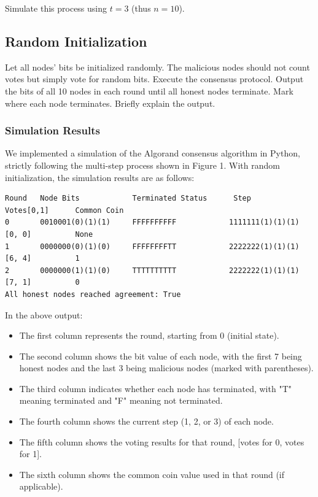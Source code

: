 \documentclass[12pt,a4paper]{article}
\begin{document}
Simulate this process using $t = 3$ (thus $n = 10$).

\subsection{Random Initialization}

Let all nodes' bits be initialized randomly. The malicious nodes should not count votes but simply vote for random bits. Execute the consensus protocol. Output the bits of all 10 nodes in each round until all honest nodes terminate. Mark where each node terminates. Briefly explain the output.

\subsubsection{Simulation Results}

We implemented a simulation of the Algorand consensus algorithm in Python, strictly following the multi-step process shown in Figure 1. With random initialization, the simulation results are as follows:

\begin{verbatim}
Round   Node Bits            Terminated Status      Step                Votes[0,1]      Common Coin
0       0010001(0)(1)(1)     FFFFFFFFFF            1111111(1)(1)(1)    [0, 0]          None
1       0000000(0)(1)(0)     FFFFFFFFTT            2222222(1)(1)(1)    [6, 4]          1
2       0000000(1)(1)(0)     TTTTTTTTTT            2222222(1)(1)(1)    [7, 1]          0
All honest nodes reached agreement: True
\end{verbatim}

In the above output:
\begin{itemize}
    \item The first column represents the round, starting from 0 (initial state).
    \item The second column shows the bit value of each node, with the first 7 being honest nodes and the last 3 being malicious nodes (marked with parentheses).
    \item The third column indicates whether each node has terminated, with "T" meaning terminated and "F" meaning not terminated.
    \item The fourth column shows the current step (1, 2, or 3) of each node.
    \item The fifth column shows the voting results for that round, [votes for 0, votes for 1].
    \item The sixth column shows the common coin value used in that round (if applicable).
\end{itemize}
\end{document}
